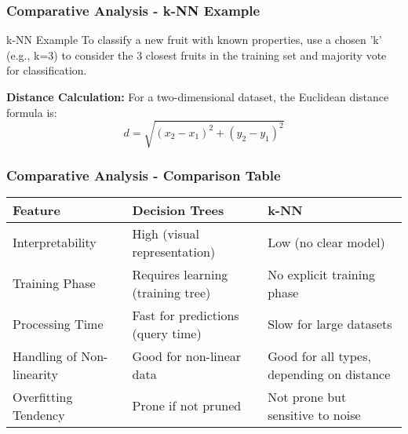 \documentclass[aspectratio=169]{beamer}
\begin{document}
\begin{frame}[fragile]
    \frametitle{Comparative Analysis - k-NN Example}
    \begin{block}{k-NN Example}
        To classify a new fruit with known properties, use a chosen 'k' (e.g., k=3) to consider the 3 
        closest fruits in the training set and majority vote for classification.

        \textbf{Distance Calculation:}
        For a two-dimensional dataset, the Euclidean distance formula is:
        \begin{equation}
            d = \sqrt{(x_2 - x_1)^2 + (y_2 - y_1)^2}
        \end{equation}
    \end{block}
\end{frame}

\begin{frame}[fragile]
    \frametitle{Comparative Analysis - Comparison Table}
    \begin{center}
        \begin{tabular}{|l|l|l|}
            \hline
            \textbf{Feature} & \textbf{Decision Trees} & \textbf{k-NN} \\
            \hline
            Interpretability & High (visual representation) & Low (no clear model) \\
            \hline
            Training Phase & Requires learning (training tree) & No explicit training phase \\
            \hline
            Processing Time & Fast for predictions (query time) & Slow for large datasets \\
            \hline
            Handling of Non-linearity & Good for non-linear data & Good for all types, depending on distance \\
            \hline
            Overfitting Tendency & Prone if not pruned & Not prone but sensitive to noise \\
            \hline
        \end{tabular}
    \end{center}
\end{frame}
\end{document}
